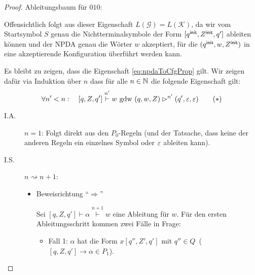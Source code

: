 \begin{proof}
    Ableitungsbaum für $010$:
    
    \begin{center}
    \vspace*{-\baselineskip}
    \end{center}
    
    Offensichtlich folgt aus dieser Eigenschaft $L(\mathcal{G}) = L(\mathcal{K})$, da wir vom Startsymbol $S$ genau die Nichtterminalsymbole der Form
    $[q^\mathsf{init}, Z^\mathsf{init}, q']$ ableiten können und der \ac{NPDA} genau die Wörter $w$ akzeptiert, für die  $(q^\mathsf{init}, w, Z^\mathsf{init})$ in eine akzeptierende Konfiguration überführt werden kann.
    
    Es bleibt zu zeigen, dass die Eigenschaft \eqref{eq:npdaToCfgProp} gilt.
    Wir zeigen dafür via Induktion über $n$ dass für alle $n\in\mathbb{N}$ die folgende Eigenschaft gilt:
	\begin{equation}
        \forall n'< n:\quad [q,Z,q']\stackrel{n'}{\vdash} w \text{ gdw } (q,w,Z) \rhd^{n'} (q',\varepsilon,\varepsilon) \tag{$*$}
    \end{equation}
    
    \begin{description}
    
    	\item[I.A.] $n=1$: Folgt direkt aus den $P_0$-Regeln (und der Tatsache, dass keine der anderen Regeln ein einzelnes Symbol oder $\varepsilon$ ableiten kann).
    	\item[I.S.] $n\rightsquigarrow n+1$:
    	\begin{itemize}
    	 \item Beweisrichtung "`$\Rightarrow$"'
    	 
    	 Sei $[q,Z,q']\vdash\alpha\stackrel{n+1}{\vdash} w$ eine Ableitung für $w$. Für den ersten Ableitungsschritt kommen zwei Fälle in Frage:
      \begin{itemize}
      \item Fall 1: $\alpha$ hat die Form $x[q'', Z', q']$ mit $q'' \in Q$\  ($[q,Z,q']\rightarrow\alpha \in P_1$).
      

\end{itemize}
\end{itemize}
\end{description}
\end{proof}
